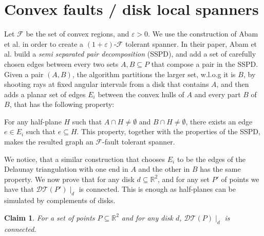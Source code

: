 \documentclass{article}
\newtheorem{claim}[theorem]{Claim}
\newcommand{\eps}{\varepsilon}
\newcommand{\R}{\mathbb{R}}
\newcommand{\FF}{\mathcal{F}}
\newcommand{\DT}{\mathcal{DT}}
\begin{document}
	
	\section{Convex faults / disk local spanners}
	Let $\FF$ be the set of convex regions, and $\eps>0$. We use the construction of Abam et al. \cite{AbamBFG09} in order to create a $(1+\eps)$-$\FF$ tolerant spanner. In their paper, Abam et al. build a \emph{semi separated pair decomposition} (SSPD), and add a set of carefully chosen edges between every two sets $A,B\subseteq P$ that compose a pair in the SSPD. Given a pair $(A,B)$, the algorithm partitions the larger set, w.l.o.g it is $B$, by shooting rays at fixed angular intervals from a disk that contains $A$, and then adds a planar set of edges $E_i$ between the convex hulls of $A$ and every part $B$ of $B$, that has the following property:
	
	For any half-plane $H$ such that $A\cap H\neq \emptyset$ and $B\cap H\neq \emptyset$, there exists an edge $e\in E_i$ such that $e\subseteq H$. This property, together with the properties of the SSPD, makes the resulted graph an $\FF$-fault tolerant spanner.
	
	We notice, that a similar construction that chooses $E_i$ to be the edges of the Delaunay triangulation with one end in $A$ and the other in $B$ has the same property. We now prove that for any disk $d\subseteq \R^2$, and for any set $P'$ of points we have that $\DT(P')\mid_d$ is connected. This is enough as half-planes can be simulated by complements of disks.
	
	\begin{claim}
		For a set of points $P\subseteq \R^2$ and for any disk $d$, $\DT(P)\mid_d$ is connected.
	\end{claim}
\end{document}

